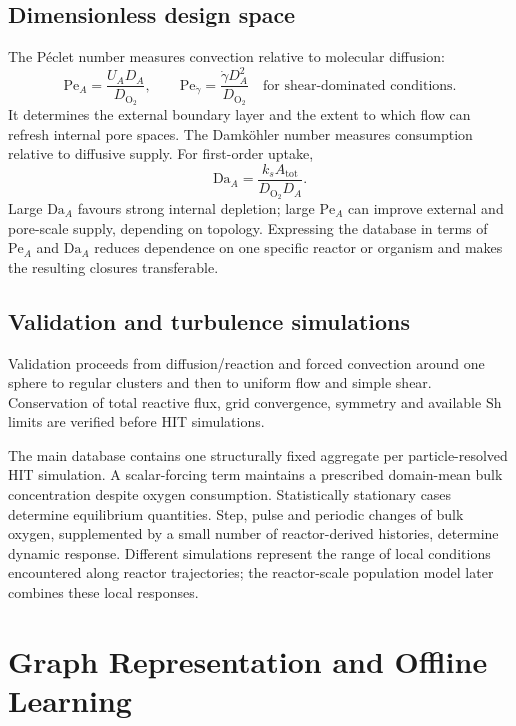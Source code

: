 \documentclass[11pt,a4paper]{article}
\newcommand{\Pe}{\mathrm{Pe}}
\newcommand{\Da}{\mathrm{Da}}
\newcommand{\Sh}{\mathrm{Sh}}
\newcommand{\Otwo}{\mathrm{O}_2}
\begin{document}
\subsection{Dimensionless design space}

The P\'eclet number measures convection relative to molecular diffusion:
\begin{equation}
  \Pe_A=\frac{U_A D_A}{D_{\Otwo}},
  \qquad
  \Pe_{\dot{\gamma}}=\frac{\dot{\gamma}D_A^2}{D_{\Otwo}}
  \quad\text{for shear-dominated conditions}.
  \label{eq:pe}
\end{equation}
It determines the external boundary layer and the extent to which flow can
refresh internal pore spaces. The Damk\"ohler number measures consumption
relative to diffusive supply. For first-order uptake,
\begin{equation}
  \Da_A=\frac{k_s A_{\mathrm{tot}}}{D_{\Otwo}D_A}.
  \label{eq:da}
\end{equation}
Large \(\Da_A\) favours strong internal depletion; large \(\Pe_A\) can improve
external and pore-scale supply, depending on topology. Expressing the database
in terms of \(\Pe_A\) and \(\Da_A\) reduces dependence on one specific reactor
or organism and makes the resulting closures transferable.

\subsection{Validation and turbulence simulations}

Validation proceeds from diffusion/reaction and forced convection around one
sphere to regular clusters and then to uniform flow and simple shear.
Conservation of total reactive flux, grid convergence, symmetry and available
\(\Sh\) limits are verified before HIT simulations.

The main database contains one structurally fixed aggregate per
particle-resolved HIT simulation. A scalar-forcing term maintains a prescribed
domain-mean bulk concentration despite oxygen consumption. Statistically
stationary cases determine equilibrium quantities. Step, pulse and periodic
changes of bulk oxygen, supplemented by a small number of reactor-derived
histories, determine dynamic response. Different simulations represent the
range of local conditions encountered along reactor trajectories; the
reactor-scale population model later combines these local responses.

\section{Graph Representation and Offline Learning}
\end{document}

